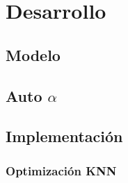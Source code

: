 \documentclass[../main.tex]{subfiles}
\begin{document}
\section{Desarrollo} 

\subsection{Modelo}

\subsection{Auto \(\alpha\)}

\subsection{Implementación}

\subsubsection{Optimización KNN}
\end{document}
